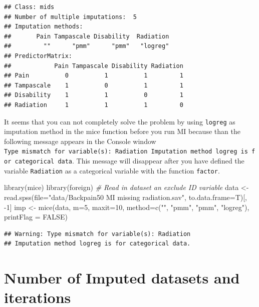 \documentclass[
]{book}
\newenvironment{Shaded}{\begin{snugshade}}{\end{snugshade}}
\newcommand{\AttributeTok}[1]{\textcolor[rgb]{0.77,0.63,0.00}{#1}}
\newcommand{\CommentTok}[1]{\textcolor[rgb]{0.56,0.35,0.01}{\textit{#1}}}
\newcommand{\ConstantTok}[1]{\textcolor[rgb]{0.00,0.00,0.00}{#1}}
\newcommand{\DecValTok}[1]{\textcolor[rgb]{0.00,0.00,0.81}{#1}}
\newcommand{\FunctionTok}[1]{\textcolor[rgb]{0.00,0.00,0.00}{#1}}
\newcommand{\NormalTok}[1]{#1}
\newcommand{\OtherTok}[1]{\textcolor[rgb]{0.56,0.35,0.01}{#1}}
\newcommand{\SpecialCharTok}[1]{\textcolor[rgb]{0.00,0.00,0.00}{#1}}
\newcommand{\StringTok}[1]{\textcolor[rgb]{0.31,0.60,0.02}{#1}}
\begin{document}
\begin{verbatim}
## Class: mids
## Number of multiple imputations:  5 
## Imputation methods:
##       Pain Tampascale Disability  Radiation 
##         ""      "pmm"      "pmm"   "logreg" 
## PredictorMatrix:
##            Pain Tampascale Disability Radiation
## Pain          0          1          1         1
## Tampascale    1          0          1         1
## Disability    1          1          0         1
## Radiation     1          1          1         0
\end{verbatim}

It seems that you can not completely solve the problem by using \texttt{logreg} as imputation method in the mice function before you run MI because than the following message appears in the Console window \texttt{Type\ mismatch\ for\ variable(s):\ Radiation\ Imputation\ method\ logreg\ is\ for\ categorical\ data}. This message will disappear after you have defined the variable \texttt{Radiation} as a categorical variable with the function \texttt{factor}.

\begin{Shaded}
\begin{Highlighting}[]
\FunctionTok{library}\NormalTok{(mice)}
\FunctionTok{library}\NormalTok{(foreign)}
\CommentTok{\# Read in dataset an exclude ID variable}
\NormalTok{data }\OtherTok{\textless{}{-}} \FunctionTok{read.spss}\NormalTok{(}\AttributeTok{file=}\StringTok{"data/Backpain50 MI missing radiation.sav"}\NormalTok{, }\AttributeTok{to.data.frame=}\NormalTok{T)[, }\SpecialCharTok{{-}}\DecValTok{1}\NormalTok{] }
\NormalTok{imp }\OtherTok{\textless{}{-}} \FunctionTok{mice}\NormalTok{(data, }\AttributeTok{m=}\DecValTok{5}\NormalTok{, }\AttributeTok{maxit=}\DecValTok{10}\NormalTok{, }\AttributeTok{method=}\FunctionTok{c}\NormalTok{(}\StringTok{""}\NormalTok{, }\StringTok{"pmm"}\NormalTok{, }\StringTok{"pmm"}\NormalTok{, }\StringTok{"logreg"}\NormalTok{), }\AttributeTok{printFlag =} \ConstantTok{FALSE}\NormalTok{)}
\end{Highlighting}
\end{Shaded}

\begin{verbatim}
## Warning: Type mismatch for variable(s): Radiation
## Imputation method logreg is for categorical data.
\end{verbatim}

\hypertarget{number-of-imputed-datasets-and-iterations}{%
\section{Number of Imputed datasets and iterations}\label{number-of-imputed-datasets-and-iterations}}
\end{document}
